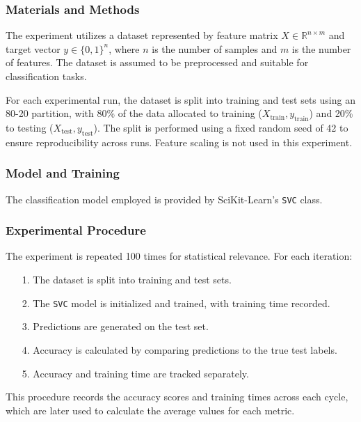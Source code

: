 \documentclass{article}
\theoremstyle{plain}
\theoremstyle{definition}
\theoremstyle{remark}
\begin{document}
\subsubsection{Materials and Methods}

The experiment utilizes a dataset represented by feature matrix $ X \in \mathbb{R}^{n \times m} $ and target vector $ y \in \{0, 1\}^n $, where $ n $ is the number of samples and $ m $ is the number of features. The dataset is assumed to be preprocessed and suitable for classification tasks.

For each experimental run, the dataset is split into training and test sets using an 80-20 partition, with 80\% of the data allocated to training ($ X_{\text{train}}, y_{\text{train}} $) and 20\% to testing ($ X_{\text{test}}, y_{\text{test}} $). The split is performed using a fixed random seed of 42 to ensure reproducibility across runs. Feature scaling is not used in this experiment.


\subsubsection{Model and Training}

The classification model employed is provided by SciKit-Learn's \texttt{SVC} class.


\subsubsection{Experimental Procedure}

The experiment is repeated 100 times for statistical relevance. For each iteration:

\begin{itemize}
	\item [1.] The dataset is split into training and test sets.
	\item [2.] The \texttt{SVC} model is initialized and trained, with training time recorded.
	\item [3.] Predictions are generated on the test set.
	\item [4.] Accuracy is calculated by comparing predictions to the true test labels.
	\item [5.] Accuracy and training time are tracked separately.
\end{itemize}

This procedure records the accuracy scores and training times across each cycle, which are later used to calculate the average values for each metric.
\end{document}
